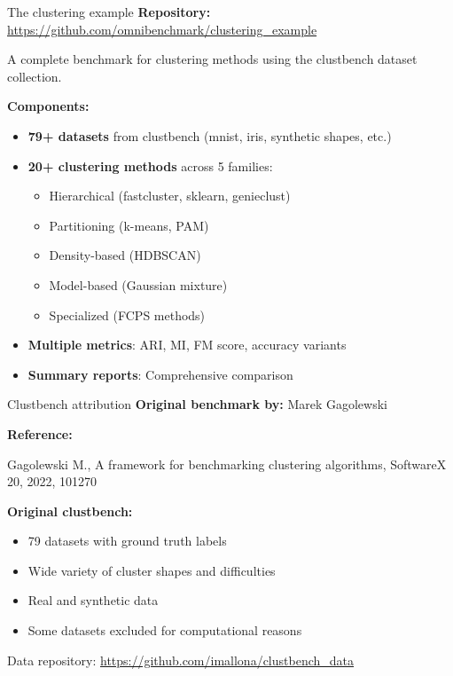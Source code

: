 \documentclass[aspectratio=169]{beamer}
\begin{document}
\begin{frame}{The clustering example}
    \textbf{Repository:} \url{https://github.com/omnibenchmark/clustering\_example}
    
    \vspace{0.3cm}
    A complete benchmark for clustering methods using the clustbench dataset collection.
    
    \vspace{0.3cm}
    \textbf{Components:}
    \begin{itemize}
        \item \textbf{79+ datasets} from clustbench (mnist, iris, synthetic shapes, etc.)
        \item \textbf{20+ clustering methods} across 5 families:
            \begin{itemize}
                \item Hierarchical (fastcluster, sklearn, genieclust)
                \item Partitioning (k-means, PAM)
                \item Density-based (HDBSCAN)
                \item Model-based (Gaussian mixture)
                \item Specialized (FCPS methods)
            \end{itemize}
        \item \textbf{Multiple metrics}: ARI, MI, FM score, accuracy variants
        \item \textbf{Summary reports}: Comprehensive comparison
    \end{itemize}
    
\end{frame}

\begin{frame}{Clustbench attribution}
    \textbf{Original benchmark by:} Marek Gagolewski
    
    \textbf{Reference:}
    
    Gagolewski M., A framework for benchmarking clustering algorithms, SoftwareX 20, 2022, 101270
    
    \vspace{0.3cm}
    \textbf{Original clustbench:}
    \begin{itemize}
        \item 79 datasets with ground truth labels
        \item Wide variety of cluster shapes and difficulties
        \item Real and synthetic data
        \item Some datasets excluded for computational reasons
    \end{itemize}
    
    \vspace{0.3cm}
    Data repository: \url{https://github.com/imallona/clustbench\_data}
\end{frame}
\end{document}
